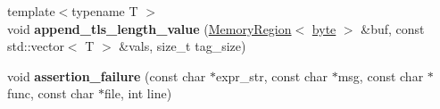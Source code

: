 \begin{DoxyCompactItemize}
\item 
\hypertarget{namespaceBotan_a978e790bf740735dac3cd4b7b6556e77}{{\footnotesize template$<$typename T $>$ }\\void {\bfseries append\-\_\-tls\-\_\-length\-\_\-value} (\hyperlink{classBotan_1_1MemoryRegion}{Memory\-Region}$<$ \hyperlink{namespaceBotan_a7d793989d801281df48c6b19616b8b84}{byte} $>$ \&buf, const std\-::vector$<$ T $>$ \&vals, size\-\_\-t tag\-\_\-size)}\label{namespaceBotan_a978e790bf740735dac3cd4b7b6556e77}

\item 
\hypertarget{namespaceBotan_ae84c7cbfaca4fb52e360e794a58f887b}{void {\bfseries assertion\-\_\-failure} (const char $\ast$expr\-\_\-str, const char $\ast$msg, const char $\ast$func, const char $\ast$file, int line)}\label{namespaceBotan_ae84c7cbfaca4fb52e360e794a58f887b}


\end{DoxyCompactItemize}
